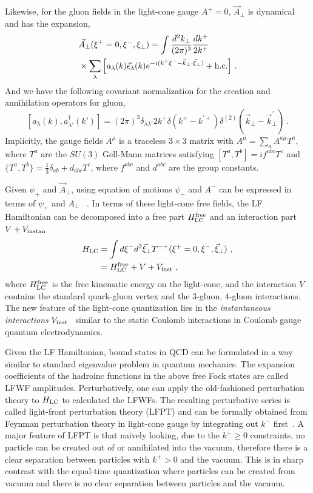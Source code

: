 \documentclass[twocolumn,superscriptaddress,longbibliography,10pt]{revtex4-1}
\begin{document}
Likewise, for the gluon fields in the light-cone gauge $A^+=0$,
$\vec{A}_\perp$ is dynamical and has the expansion,
\begin{align}\label{eq:LFgluon}
  &  \vec{A}_\perp(\xi^+=0,\xi^-,\xi_\perp)
  =  \int \frac{d^2k_\perp}{(2\pi)^3}
    \frac{dk^+}{ 2k^+}
    \nonumber \\
 & \times \sum_\lambda  \Big[ a_\lambda(k) \vec{\epsilon}_\lambda(k)e^{-i(k^+\xi^--\vec{k}_\perp\cdot\vec{\xi}_\perp)}
  + {\rm h.c.} \Big] \ .
\end{align}
And we have the following covariant normalization for the creation and annihilation operators for gluon,
\begin{equation}
\left[a_\lambda(k),a_{\lambda'}^\dagger(k')\right]=(2\pi)^3\delta_{\lambda\lambda'}2k^+\delta(k^+-k^{'+})
\delta^{(2)}(\vec{k}_\perp-\vec{k}_\perp^\prime) \ .
\end{equation}
Implicitly, the gauge fields $A^\mu$ is a traceless $3\times 3$
matrix with $A^\mu=\sum_aA^{a\mu}T^a$, where $T^a$ are the
$SU(3)$ Gell-Mann matrices satisfying $[T^a,T^b]=if^{abc}T^c$
and $\{T^a,T^b\}=\frac{1}{3}\delta_{ab}+d_{abc}T^c$, where $f^{abc}$ and $d^{abc}$ are the group constants.

Given $\psi_+$ and $\vec{A}_\perp$, using equation of motions $\psi_-$ and $A^-$ can be expressed in terms of $\psi_+$ and $A_\perp$ ~\cite{Kogut:1969xa}.  In terms of these light-cone free fields, the LF Hamiltonian can be decomposed into a free part $H_{\rm LC}^{\rm free}$ and an interaction part $V+V_{\rm instan} $
\begin{align}
    H_{\rm LC}&=\int d\xi^-d^2\vec{\xi}_\perp T^{-+}(\xi^+=0,\xi^-,\vec{\xi}_\perp) \ , \nonumber \\
    &=H_{\rm LC}^{\rm free}+V+V_{\rm inst} \ ,
\end{align}
where $H_{\rm LC}^{\rm free}$
is the free kinematic energy on the light-cone, and the interaction $V$ contains the standard quark-gluon vertex and the $3$-gluon, $4$-gluon interactions. The new feature of the light-cone quantization lies in the {\it instantaneous interactions} $V_{\rm inst}$~\cite{Brodsky:1997de} similar to the static Coulomb interactions in Coulomb gauge quantum electrodynamics.

Given the LF Hamiltonian, bound states in QCD can be formulated in a way similar to standard eigenvalue problem in quantum mechanics. The expansion coefficients of the hadroinc functions in the above free Fock states are called LFWF amplitudes. Perturbatively, one can apply the old-fashioned perturbation theory to $H_{\rm LC}$ to calculated the LFWFs. The resulting perturbative series is called light-front perturbation theory (LFPT) and can be formally obtained from Feynman perturbation theory in light-cone gauge by integrating out $k^-$ first~\cite{Collins:2011ca}. A major feature of LFPT is that naively looking, due to the $k^+\ge 0$ constraints, no particle can be created out of or annihilated into the vacuum, therefore there is a clear separation between particles with $k^+>0$ and the vacuum. This is in sharp contrast with the equal-time quantization where particles can be created from vacuum and there is no clear separation between particles and the vacuum.
\end{document}
